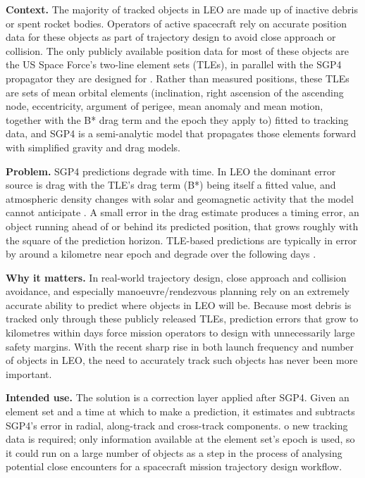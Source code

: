 \documentclass[11pt, a4paper]{article}
\begin{document}
\textbf{Context.} The majority of tracked objects in LEO are made up of inactive debris or spent rocket bodies. Operators of active spacecraft rely on accurate position data for these objects as part of trajectory design to avoid close approach or collision. The only publicly available position data for most of these objects are the US Space Force's two-line element sets (TLEs), in parallel with the SGP4 propagator they are designed for \cite{hoots1980,vallado2006}. Rather than measured positions, these TLEs are sets of mean orbital elements (inclination, right ascension of the ascending node, eccentricity, argument of perigee, mean anomaly and mean motion, together with the B* drag term and the epoch they apply to) fitted to tracking data, and SGP4 is a semi-analytic model that propagates those elements forward with simplified gravity and drag models.

\textbf{Problem.} SGP4 predictions degrade with time. In LEO the dominant error source is drag with the TLE's drag term (B*) being itself a fitted value, and atmospheric density changes with solar and geomagnetic activity that the model cannot anticipate \cite{vallado2013,picone2002}. A small error in the drag estimate produces a timing error, an object running ahead of or behind its predicted position, that grows roughly with the square of the prediction horizon. TLE-based predictions are typically in error by around a kilometre near epoch and degrade over the following days \cite{levit2011}.

\textbf{Why it matters.} In real-world trajectory design, close approach and collision avoidance, and especially manoeuvre/rendezvous planning rely on an extremely accurate ability to predict where objects in LEO will be. Because most debris is tracked only through these publicly released TLEs, prediction errors that grow to kilometres within days force mission operators to design with unnecessarily large safety margins. With the recent sharp rise in both launch frequency and number of objects in LEO, the need to accurately track such objects has never been more important.

\textbf{Intended use.} The solution is a correction layer applied after SGP4. Given an element set and a time at which to make a prediction, it estimates and subtracts SGP4's error in radial, along-track and cross-track components. o new tracking data is required; only information available at the element set's epoch is used, so it could run on a large number of objects as a step in the process of analysing potential close encounters for a spacecraft mission trajectory design workflow.
\end{document}
